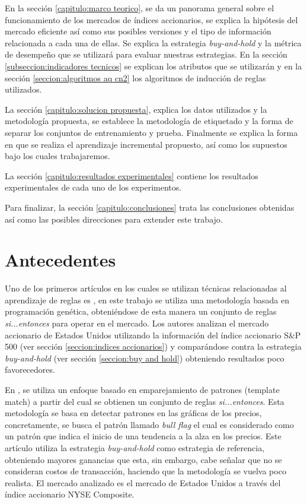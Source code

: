 \documentclass[12pt]{scrbook}
\theoremstyle{break}
\theoremstyle{break}
\newcommand{\buyhold}{\textit{buy-and-hold} }
\begin{document}
En la sección \ref{capitulo:marco teorico}, se da un panorama general sobre el funcionamiento de los mercados de índices accionarios, se explica la hipótesis del mercado eficiente así como sus posibles versiones y el tipo de información relacionada a cada una de ellas. Se explica la estrategia \buyhold y la métrica de desempeño que se utilizará para evaluar nuestras estrategias. En la sección \ref{subseccion:indicadores tecnicos} se explican los atributos que se utilizarán y en la sección \ref{seccion:algoritmos aq cn2} los algoritmos de inducción de reglas utilizados.

La sección \ref{capitulo:solucion propuesta}, explica los datos utilizados y la metodología propuesta, se establece la metodología de etiquetado y la forma de separar los conjuntos de entrenamiento y prueba. Finalmente se explica la forma en que se realiza el aprendizaje incremental propuesto, así como los supuestos bajo los cuales trabajaremos.

La sección \ref{capitulo:resultados experimentales} contiene los resultados experimentales de cada uno de los experimentos.

Para finalizar, la sección \ref{capitulo:conclusiones} trata las conclusiones obtenidas así como las posibles direcciones para extender este trabajo.




\chapter{Antecedentes}
\label{capitulo:antecedentes}
Uno de los primeros artículos en los cuales se utilizan técnicas relacionadas al aprendizaje de reglas es \cite{Allen1999}, en este trabajo se utiliza una metodología basada en programación genética, obteniéndose de esta manera un conjunto de reglas \textit{si...entonces} para operar en el mercado. Los autores analizan el mercado accionario de Estados Unidos utilizando la información del índice accionario S\&P 500 (ver sección \ref{seccion:indices accionarios}) y comparándose contra la estrategia \buyhold (ver sección \ref{seccion:buy and hold}) obteniendo resultados poco favorecedores.

En \cite{Leigh2002}, se utiliza un enfoque basado en emparejamiento de patrones (template match) a partir del cual se obtienen un conjunto de reglas \textit{si...entonces}. Esta metodología se basa en detectar patrones en las gráficas de los precios, concretamente, se busca el patrón llamado \textit{bull flag} el cual es considerado como un patrón que indica el inicio de una tendencia a la alza en los precios. Este artículo utiliza la estrategia \buyhold como estrategia de referencia, obteniendo mayores ganancias que esta, sin embargo, cabe señalar que no se consideran costos de transacción, haciendo que la metodología se vuelva poco realista. El mercado analizado es el mercado de Estados Unidos a través del índice accionario NYSE Composite.
\end{document}
